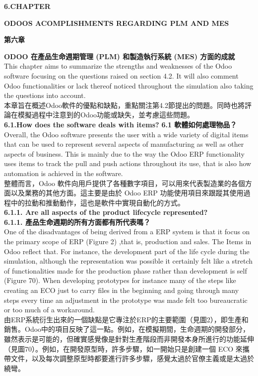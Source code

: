 \documentclass[12pt,a4paper]{report}  %
\begin{document}
\begin{center} %
\Large\textbf{6.CHAPTER} %
\end{center}
\Large\textbf{ODOOS ACOMPLISHMENTS REGARDING PLM AND 
MES}
\begin{center}
\Large\textbf{第六章}
\end{center}
\Large\textbf{ODOO 在產品生命週期管理 (PLM) 和製造執行系統 (MES) 方面的成就}\\

This chapter aims to summarize the strengths and weaknesses of the Odoo software 
focusing on the questions raised on section 4.2. It will also comment Odoo functionalities or 
lack thereof noticed throughout the simulation also taking the questions into account.\\
本章旨在概述Odoo軟件的優點和缺點，重點關注第4.2節提出的問題。同時也將評論在模擬過程中注意到的Odoo功能或缺失，並考慮這些問題。\\

\Large\textbf{6.1.How does the software deals with items?}
\Large\textbf{6.1 軟體如何處理物品？}\\

Overall, the Odoo software presents the user with a wide variety of digital items that can 
be used to represent several aspects of manufacturing as well as other aspects of business. 
This is mainly due to the way the Odoo ERP functionality uses items to track the pull and 
push actions throughout its use, that is also how automation is achieved in the software.\\
整體而言，Odoo 軟件向用戶提供了各種數字項目，可以用來代表製造業的各個方面以及業務的其他方面。這主要是由於 Odoo ERP 功能使用項目來跟蹤其使用過程中的拉動和推動動作，這也是軟件中實現自動化的方式。\\

\Large\textbf{6.1.1. Are all aspects of the product lifecycle represented?}\\
\Large\textbf{6.1.1. 產品生命週期的所有方面都有所代表嗎？}\\

One of the disadvantages of being derived from a ERP system is that it focus on the 
primary scope of ERP (Figure 2) ,that is, production and sales. The Items in Odoo reflect 
that. For instance, the development part of the life cycle during the simulation, although the 
representation was possible it certainly felt like a stretch of functionalities made for the 
production phase rather than development is self (Figure 70). When developing prototypes 
for instance many of the steps like creating an ECO just to carry files in the beginning and
going through many steps every time an adjustment in the prototype was made felt too
bureaucratic or too much of a workaround.\\
由ERP系統衍生出來的一個缺點是它專注於ERP的主要範圍（見圖2），即生產和銷售。Odoo中的項目反映了這一點。例如，在模擬期間，生命週期的開發部分，雖然表示是可能的，但確實感覺像是針對生產階段而非開發本身所進行的功能延伸（見圖70）。例如，在開發原型時，許多步驟，如一開始只是創建一個 ECO 來攜帶文件，以及每次調整原型時都要進行許多步驟，感覺太過於官僚主義或是太過於繞彎。\\
\end{document}
